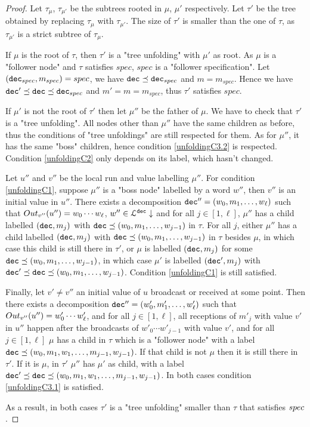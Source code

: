 \ifproofs
\begin{proof}
		Let $\tau_{\mu}$, $\tau_{\mu'}$ be the subtrees rooted in $\mu$, $\mu'$ respectively. 
	Let $\tau'$ be the tree obtained by replacing $\tau_{\mu}$ with $\tau_{\mu'}$. The size of $\tau'$ is smaller than the one of $\tau$, as $\tau_{\mu'}$ is a strict subtree of $\tau_{\mu}$.
	
	If $\mu$ is the root of $\tau$, then $\tau'$ is a "tree unfolding" with $\mu'$ as root. As $\mu$ is a "follower node" and $\tau$ satisfies $spec$, $spec$ is a "follower specification". Let $(\mathtt{dec}_{spec}, m_{spec}) = spec$, we have $\mathtt{dec} \preceq \mathtt{dec}_{spec}$ and $m = m_{spec}$. 
	Hence we have $\mathtt{dec}' \preceq \mathtt{dec} \preceq \mathtt{dec}_{spec}$ and $m' = m = m_{spec}$, thus $\tau'$ satisfies $spec$.
	
	If  $\mu'$ is not the root of $\tau'$ then let $\mu''$ be the father of $\mu$. We have to check that $\tau'$ is a "tree unfolding". 
	All nodes other than $\mu''$ have the same children as before, thus the conditions of "tree unfoldings" are still respected for them.
	As for $\mu''$, it has the same "boss" children, hence condition \ref{unfoldingC3.2} is respected. Condition \ref{unfoldingC2} only depends on its label, which hasn't changed.
	
	Let $u''$ and $v''$ be the local run and value labelling $\mu''$.
	For condition \ref{unfoldingC1}, suppose $\mu''$ is a "boss node" labelled by a word $w''$, then $v''$ is an initial value in $u''$. There exists a decomposition $\mathtt{dec}'' = (w_0, m_1, \ldots, w_\ell)$ such that $\voutput{v''}{u''} = w_0\cdots w_\ell$, $w''\in \mathcal{L}^{\mathtt{\mathtt{dec}}}\downarrow$ and for all $j \in [1,\ell]$, $\mu''$ has a child labelled $(\mathtt{dec},m_j)$ with $\mathtt{dec} \preceq (w_0, m_1, \ldots, w_{j-1})$ in $\tau$.
	For all $j$, either $\mu''$ has a child labelled $(\mathtt{dec},m_j)$ with $\mathtt{dec} \preceq (w_0, m_1, \ldots, w_{j-1})$ in $\tau$ besides $\mu$, in which case this child is still there in $\tau'$, or $\mu$ is labelled $(\mathtt{dec},m_j)$ for some $\mathtt{dec} \preceq (w_0, m_1, \ldots, w_{j-1})$, in which case $\mu'$ is labelled $(\mathtt{dec}', m_j)$ with  $\mathtt{dec}' \preceq \mathtt{dec} \preceq (w_0, m_1, \ldots, w_{j-1})$.
	Condition \ref{unfoldingC1} is still satisfied.
	
	Finally, let $v' \neq v''$ an initial value of $u$ broadcast or received at some point.
	Then there exists a decomposition $\mathtt{dec}'' = (w'_0, m'_1, \ldots, w'_\ell)$ such that $\voutput{v''}{u''} = w'_0\cdots w'_\ell$, and for all $j \in [1,\ell]$, all receptions of $m'_j$ with value $v'$ in $u''$ happen after the broadcasts of $w'_0\cdots w'_{j-1}$ with value $v'$, and for all $j \in [1,\ell]$ $\mu$ has a child in $\tau$ which is a "follower node" with a label $\mathtt{dec} \preceq (w_0, m_1, w_1, \ldots, m_{j-1}, w_{j-1})$.
	If that child is not $\mu$ then it is still there in $\tau'$. If it is $\mu$, in $\tau'$ $\mu''$ has $\mu'$ as child, with a label $\mathtt{dec}' \preceq \mathtt{dec} \preceq (w_0, m_1, w_1, \ldots, m_{j-1}, w_{j-1})$.
	In both cases condition \ref{unfoldingC3.1} is satisfied.
	
	As a result, in both cases $\tau'$ is a "tree unfolding" smaller than $\tau$ that satisfies $spec$. 
\end{proof}
